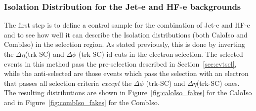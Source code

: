 
\subsubsection{Isolation Distribution for the Jet-e and HF-e backgrounds}

The first step is to define a control sample for the combination of Jet-e and HF-e and to see how well it can describe the Isolation distributions (both CaloIso and CombIso) in the selection region.  As stated previously, this is done by inverting the $\Delta \eta$(trk-SC) and $\Delta \phi$ (trk-SC) id cuts in the electron selection. The selected events in this method pass the pre-selection described in Section~\ref{sec:evtsel}, while the anti-selected are those events which pass the selection with an electron that passes all selection criteria {\it except} the $\Delta \phi$ (trk-SC) and $\Delta \eta$(trk-SC) ones.  The resulting distributions are shown in Figure~\ref{fig:caloIso_fakes} for the CaloIso and in Figure~\ref{fig:combIso_fakes} for the CombIso.

